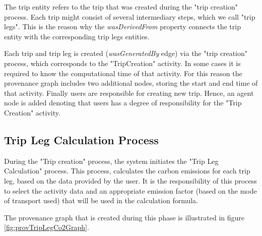 The trip entity refers to the trip that was created during the "trip creation" process.  Each trip might consist of several intermediary steps, which we call "trip legs". This is the reason why the \emph{wasDerivedFrom} property connects the trip entity with the corresponding trip legs entities.

Each trip and trip leg is created (\emph{wasGeneratedBy} edge) via the "trip creation" process, which corresponds to the "TripCreation" activity. In some cases it is required to know the computational time of that activity. For this reason the provenance graph includes two additional nodes, storing the start and end time of that activity. Finally users are responsible for creating new trip. Hence, an agent node is added denoting that users has a degree of responsibility for the "Trip Creation" activity.

\subsection{Trip Leg Calculation Process}

During the "Trip creation" process, the system initiates the "Trip Leg Calculation" process. This process, calculates the carbon emissions for each trip leg, based on the data provided by the user. It is the responsibility of this process to select the activity data and an appropriate emission factor (based on the mode of transport used) that will be used in the calculation formula.

The provenance graph that is created during this phase is illustrated in figure \ref{fig:provTripLegCo2Graph}.

